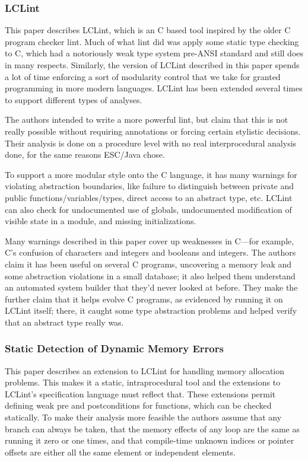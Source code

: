 \documentclass{article}
\begin{document}
\begin{multicols}{2}
\subsubsection{LCLint~\cite{195297}}

This paper describes LCLint, which is an C based tool inspired by the
older C program checker lint.  Much of what lint did was apply some
static type checking to C, which had a notoriously weak type system
pre-ANSI standard and still does in many respects.  Similarly, the
version of LCLint described in this paper spends a lot of time
enforcing a sort of modularity control that we take for granted
programming in more modern languages.  LCLint has been extended
several times to support different types of analyses.

The authors intended to write a more powerful lint, but claim that
this is not really possible without requiring annotations or forcing
certain stylistic decisions.  Their analysis is done on a procedure
level with no real interprocedural analysis done, for the same reasons
ESC/Java chose.

To support a more modular style onto the C language, it has many
warnings for violating abstraction boundaries, like failure to
distinguish between private and public functions/variables/types,
direct access to an abstract type, etc.  LCLint can also check for
undocumented use of globals, undocumented modification of visible
state in a module, and missing initializations.

Many warnings described in this paper cover up weaknesses in C---for
example, C's confusion of characters and integers and booleans and
integers.  The authors claim it has been useful on several C programs,
uncovering a memory leak and some abstraction violations in a small
database; it also helped them understand an automated system builder
that they'd never looked at before.  They make the further claim that
it helps evolve C programs, as evidenced by running it on LCLint
itself; there, it caught some type abstraction problems and helped
verify that an abstract type really was.

\subsubsection{Static Detection of Dynamic Memory Errors~\cite{231389}}

This paper describes an extension to LCLint for handling memory
allocation problems.  This makes it a static, intraprocedural tool and
the extensions to LCLint's specification language must reflect that.
These extensions permit defining weak pre and postconditions for
functions, which can be checked statically.  To make their analysis
more feasible the authors assume that any branch can always be taken,
that the memory effects of any loop are the same as running it zero or
one times, and that compile-time unknown indices or pointer offsets
are either all the same element or independent elements.


\end{multicols}
\end{document}

